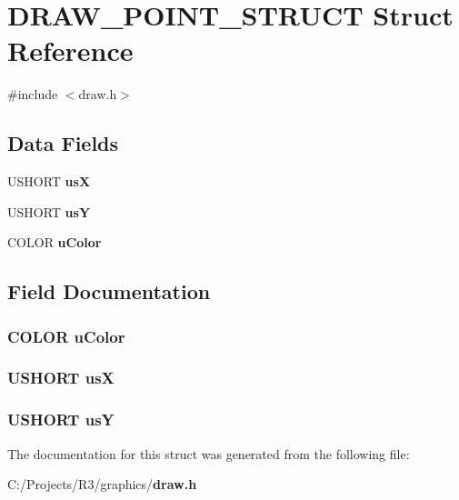 \section{DRAW\_\-POINT\_\-STRUCT Struct Reference}
\label{struct_d_r_a_w___p_o_i_n_t___s_t_r_u_c_t}


{\ttfamily \#include $<$draw.h$>$}\subsection*{Data Fields}
\begin{DoxyCompactItemize}
\item 
USHORT {\bf usX}
\item 
USHORT {\bf usY}
\item 
COLOR {\bf uColor}
\end{DoxyCompactItemize}


\subsection{Field Documentation}
\subsubsection[{uColor}]{\setlength{\rightskip}{0pt plus 5cm}COLOR {\bf uColor}}\label{struct_d_r_a_w___p_o_i_n_t___s_t_r_u_c_t_a2d70c63f42cf74663e6824f90954b7d4}
\subsubsection[{usX}]{\setlength{\rightskip}{0pt plus 5cm}USHORT {\bf usX}}\label{struct_d_r_a_w___p_o_i_n_t___s_t_r_u_c_t_a6ead387c0c38c4f3f98aac147733a602}
\subsubsection[{usY}]{\setlength{\rightskip}{0pt plus 5cm}USHORT {\bf usY}}\label{struct_d_r_a_w___p_o_i_n_t___s_t_r_u_c_t_aeb96aa8e26a2ce680ec0e55e40f33a44}


The documentation for this struct was generated from the following file:\begin{DoxyCompactItemize}
\item 
C:/Projects/R3/graphics/{\bf draw.h}\end{DoxyCompactItemize}
